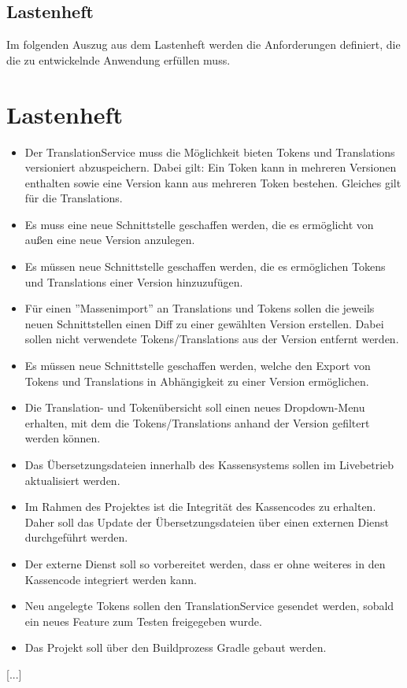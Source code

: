 \documentclass[10pt, oneside, ngerman]{article}
\begin{document}
  \subsection{Lastenheft}\label{sec:lastenheft}
  Im folgenden Auszug aus dem Lastenheft werden die Anforderungen definiert, die die zu entwickelnde
  Anwendung erfüllen muss.
  \section*{Lastenheft}
  \begin{itemize}
    \item Der TranslationService muss die Möglichkeit bieten Tokens und Translations versioniert abzuspeichern. Dabei gilt: Ein Token kann in mehreren Versionen enthalten sowie eine Version kann aus mehreren Token bestehen. Gleiches gilt für die Translations.
    \item Es muss eine neue Schnittstelle geschaffen werden, die es ermöglicht von außen eine neue Version anzulegen.
    \item Es müssen neue Schnittstelle geschaffen werden, die es ermöglichen Tokens und Translations einer Version hinzuzufügen.
    \item Für einen ''Massenimport'' an Translations und Tokens sollen die jeweils neuen Schnittstellen einen Diff zu einer gewählten Version erstellen. 
    Dabei sollen nicht verwendete Tokens/Translations aus der Version entfernt werden.
    \item Es müssen neue Schnittstelle geschaffen werden, welche den Export von Tokens und Translations in Abhängigkeit zu einer Version ermöglichen.
    \item Die Translation- und Tokenübersicht soll einen neues Dropdown-Menu erhalten, mit dem die Tokens/Translations anhand der Version gefiltert werden können.
    \item Das Übersetzungsdateien innerhalb des Kassensystems sollen im Livebetrieb aktualisiert werden.
    \item Im Rahmen des Projektes ist die Integrität des Kassencodes zu erhalten. Daher soll das Update der Übersetzungsdateien über einen externen Dienst durchgeführt werden.
    \item Der externe Dienst soll so vorbereitet werden, dass er ohne weiteres in den Kassencode integriert werden kann.
    \item Neu angelegte Tokens sollen den TranslationService gesendet werden, sobald ein neues Feature zum Testen freigegeben wurde.
    \item Das Projekt soll über den Buildprozess Gradle gebaut werden.
  \end{itemize}
  \vspace{2cm}
  \begin{center}
    [...]
  \end{center}
  \newpage
\end{document}
